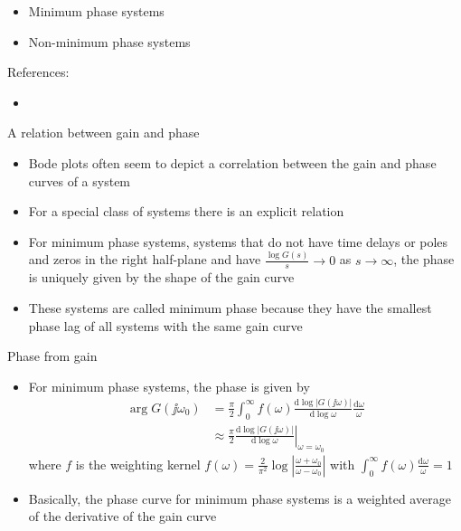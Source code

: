 \documentclass[10pt]{beamer-control}
\begin{document}

\begin{SUMMARY}
\begin{itemize}
\item Minimum phase systems
\item Non-minimum phase systems
\end{itemize}
\vfill References:
\begin{itemize}
\item \astrom[§10.4]
\end{itemize}
\end{SUMMARY}




\begin{frame}{A relation between gain and phase}
\begin{itemize}
\item Bode plots often seem to depict a correlation between the gain and phase curves of a system
\item For a special class of systems there is an explicit relation
\item  For \alert{minimum phase systems}, systems that do not have time delays or poles and zeros in the right half-plane and have $\tfrac{\log G(s)}{s}\rightarrow 0$ as $s\rightarrow \infty$,  the phase is uniquely given by the shape of the gain curve
\item These systems are called minimum phase because they have the smallest phase lag of all systems with the same gain curve
\end{itemize}
\end{frame}


\begin{frame}{Phase from gain}
\begin{itemize}
\item For minimum phase systems, the phase is given by
\begin{align}
\operatorname{arg}G(\jj\omega_0) &= \frac{\pi}{2}\int^\infty_0 f(\omega) \frac{\mathrm{d}\log |G(\jj\omega)|}{\mathrm{d}\log \omega} \frac{\mathrm{d}\omega}{\omega}\\
&\approx
\left. \frac{\pi}{2}\frac{\mathrm{d}\log |G(\jj\omega)|}{\mathrm{d}\log \omega}\right|_{\omega=\omega_0}
\end{align}
where $f$ is the weighting kernel $f(\omega)=\frac{2}{\pi^2} \log \left|\frac{\omega+\omega_0}{\omega-\omega_0}\right|$ with $\int^\infty_0 f(\omega)\frac{\mathrm{d}\omega}{\omega}=1$
\item Basically, the phase curve for minimum phase systems is a weighted average of the derivative of the gain curve
\end{itemize}
\end{frame}
\end{document}
